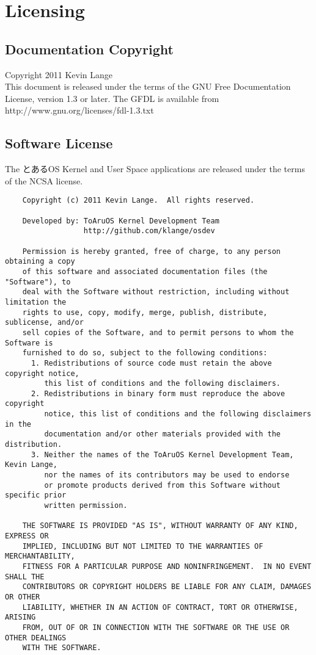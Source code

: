 \section{Licensing}

\subsection{Documentation Copyright}

Copyright 2011 Kevin Lange \\
This document is released under the terms of the GNU Free Documentation License, version 1.3 or later.
The GFDL is available from http://www.gnu.org/licenses/fdl-1.3.txt


\subsection{Software License}

The とあるOS Kernel and User Space applications are released under the terms of the NCSA license.

\begin{verbatim}
    Copyright (c) 2011 Kevin Lange.  All rights reserved.

    Developed by: ToAruOS Kernel Development Team
                  http://github.com/klange/osdev

    Permission is hereby granted, free of charge, to any person obtaining a copy
    of this software and associated documentation files (the "Software"), to
    deal with the Software without restriction, including without limitation the
    rights to use, copy, modify, merge, publish, distribute, sublicense, and/or
    sell copies of the Software, and to permit persons to whom the Software is
    furnished to do so, subject to the following conditions:
      1. Redistributions of source code must retain the above copyright notice,
         this list of conditions and the following disclaimers.
      2. Redistributions in binary form must reproduce the above copyright
         notice, this list of conditions and the following disclaimers in the
         documentation and/or other materials provided with the distribution.
      3. Neither the names of the ToAruOS Kernel Development Team, Kevin Lange,
         nor the names of its contributors may be used to endorse
         or promote products derived from this Software without specific prior
         written permission.

    THE SOFTWARE IS PROVIDED "AS IS", WITHOUT WARRANTY OF ANY KIND, EXPRESS OR
    IMPLIED, INCLUDING BUT NOT LIMITED TO THE WARRANTIES OF MERCHANTABILITY,
    FITNESS FOR A PARTICULAR PURPOSE AND NONINFRINGEMENT.  IN NO EVENT SHALL THE
    CONTRIBUTORS OR COPYRIGHT HOLDERS BE LIABLE FOR ANY CLAIM, DAMAGES OR OTHER
    LIABILITY, WHETHER IN AN ACTION OF CONTRACT, TORT OR OTHERWISE, ARISING
    FROM, OUT OF OR IN CONNECTION WITH THE SOFTWARE OR THE USE OR OTHER DEALINGS
    WITH THE SOFTWARE.
\end{verbatim}
